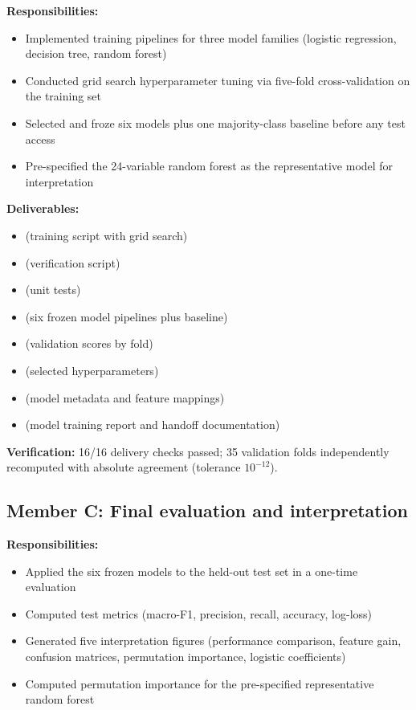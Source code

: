 \textbf{Responsibilities:}
\begin{itemize}[leftmargin=*]
  \item Implemented training pipelines for three model families (logistic regression, decision tree, random forest)
  \item Conducted grid search hyperparameter tuning via five-fold cross-validation on the training set
  \item Selected and froze six models plus one majority-class baseline before any test access
  \item Pre-specified the 24-variable random forest as the representative model for interpretation
\end{itemize}

\textbf{Deliverables:}
\begin{itemize}[leftmargin=*]
  \item {} (training script with grid search)
  \item {} (verification script)
  \item {} (unit tests)
  \item {} (six frozen model pipelines plus baseline)
  \item {} (validation scores by fold)
  \item {} (selected hyperparameters)
  \item {} (model metadata and feature mappings)
  \item {} (model training report and handoff documentation)
\end{itemize}

\textbf{Verification:} 16/16 delivery checks passed; 35 validation folds independently recomputed with absolute agreement (tolerance $10^{-12}$).

\subsection{Member C: Final evaluation and interpretation}

\textbf{Responsibilities:}
\begin{itemize}[leftmargin=*]
  \item Applied the six frozen models to the held-out test set in a one-time evaluation
  \item Computed test metrics (macro-F1, precision, recall, accuracy, log-loss)
  \item Generated five interpretation figures (performance comparison, feature gain, confusion matrices, permutation importance, logistic coefficients)
  \item Computed permutation importance for the pre-specified representative random forest
\end{itemize}

